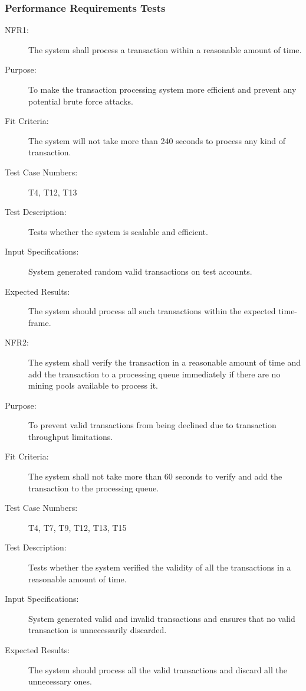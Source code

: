 \documentclass[a4paper,twoside,phd]{BYUPhys}
\begin{document}
\subsubsection{Performance Requirements Tests}
\begin{description}
\item[NFR1:] The system shall process a transaction within a reasonable amount of time.
\item[Purpose:] To make the transaction processing system more efficient and prevent any potential brute force attacks.
\item[Fit Criteria:] The system will not take more than 240 seconds to process any kind of transaction.
\item[Test Case Numbers:] T4, T12, T13
\item[Test Description:] Tests whether the system is scalable and efficient.
\item[Input Specifications:] System generated random valid transactions on test accounts.
\item[Expected Results:] The system should process all such transactions within the expected time-frame.

\item[NFR2:] The system shall verify the transaction in a reasonable amount of time and add the transaction to a processing queue immediately if there are no mining pools available to process it.
\item[Purpose:] To prevent valid transactions from being declined due to transaction throughput limitations.
\item[Fit Criteria:] The system shall not take more than 60 seconds to verify and add the transaction to the processing queue.
\item[Test Case Numbers:] T4, T7, T9, T12, T13, T15
\item[Test Description:] Tests whether the system verified the validity of all the transactions in a reasonable amount of time.
\item[Input Specifications:] System generated valid and invalid transactions and ensures that no valid transaction is unnecessarily discarded.
\item[Expected Results:] The system should process all the valid transactions and discard all the unnecessary ones.


\end{description}
\end{document}
